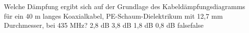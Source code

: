     {Welche Dämpfung ergibt sich auf der Grundlage des Kabeldämpfungsdiagramms für ein 40 m langes Koaxialkabel, PE-Schaum-Dielektrikum mit 12,7 mm Durchmesser, bei 435 MHz?}
    {2,8 dB}
    {3,8 dB}
    {1,8 dB}
    {0,8 dB}
    {false}{false}